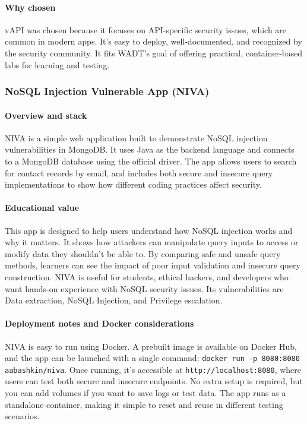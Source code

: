 \documentclass[12pt]{article}
\begin{document}
\paragraph{Why chosen}
vAPI was chosen because it focuses on API-specific security issues, which are common in modern apps. It’s easy to deploy, well-documented, and recognized by the security community. It fits WADT’s goal of offering practical, container-based labs for learning and testing.

\subsubsection{NoSQL Injection Vulnerable App (NIVA)}

\paragraph{Overview and stack}
NIVA is a simple web application built to demonstrate NoSQL injection vulnerabilities in MongoDB. It uses Java as the backend language and connects to a MongoDB database using the official driver. The app allows users to search for contact records by email, and includes both secure and insecure query implementations to show how different coding practices affect security.

\paragraph{Educational value}
This app is designed to help users understand how NoSQL injection works and why it matters. It shows how attackers can manipulate query inputs to access or modify data they shouldn’t be able to. By comparing safe and unsafe query methods, learners can see the impact of poor input validation and insecure query construction. NIVA is useful for students, ethical hackers, and developers who want hands-on experience with NoSQL security issues. Its vulnerabilities are Data extraction, NoSQL Injection, and Privilege escalation.

\paragraph{Deployment notes and Docker considerations}
NIVA is easy to run using Docker. A prebuilt image is available on Docker Hub, and the app can be launched with a single command: \texttt{docker run -p 8080:8080 aabashkin/niva}. Once running, it’s accessible at \texttt{http://localhost:8080}, where users can test both secure and insecure endpoints. No extra setup is required, but you can add volumes if you want to save logs or test data. The app runs as a standalone container, making it simple to reset and reuse in different testing scenarios.
\end{document}
